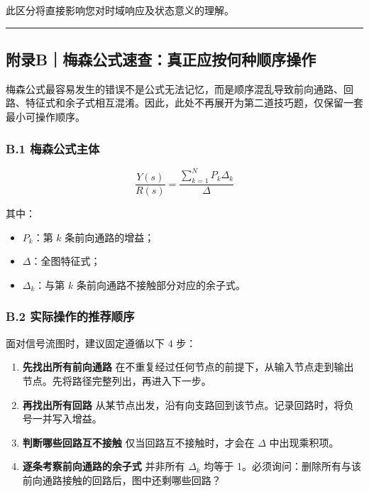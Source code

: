 \documentclass[
  11pt]{article}
\providecommand{\tightlist}{%
  \setlength{\itemsep}{0pt}\setlength{\parskip}{0pt}}
\begin{document}
此区分将直接影响您对时域响应及状态意义的理解。

\begin{center}\rule{0.5\linewidth}{0.5pt}\end{center}

\subsection{附录B｜梅森公式速查：真正应按何种顺序操作}\label{ux9644ux5f55bux6885ux68eeux516cux5f0fux901fux67e5ux771fux6b63ux5e94ux6309ux4f55ux79cdux987aux5e8fux64cdux4f5c}

梅森公式最容易发生的错误不是公式无法记忆，而是顺序混乱导致前向通路、回路、特征式和余子式相互混淆。因此，此处不再展开为第二道技巧题，仅保留一套最小可操作顺序。

\subsubsection{B.1
梅森公式主体}\label{b.1-ux6885ux68eeux516cux5f0fux4e3bux4f53}

\[
\frac{Y(s)}{R(s)}=\frac{\sum_{k=1}^{N}P_k\Delta_k}{\Delta}
\]

其中：

\begin{itemize}
\tightlist
\item
  \(P_k\)：第 \(k\) 条前向通路的增益；
\item
  \(\Delta\)：全图特征式；
\item
  \(\Delta_k\)：与第 \(k\) 条前向通路不接触部分对应的余子式。
\end{itemize}

\subsubsection{B.2
实际操作的推荐顺序}\label{b.2-ux5b9eux9645ux64cdux4f5cux7684ux63a8ux8350ux987aux5e8f}

面对信号流图时，建议固定遵循以下 4 步：

\begin{enumerate}
\def\labelenumi{\arabic{enumi}.}
\item
  \textbf{先找出所有前向通路}
  在不重复经过任何节点的前提下，从输入节点走到输出节点。先将路径完整列出，再进入下一步。
\item
  \textbf{再找出所有回路}
  从某节点出发，沿有向支路回到该节点。记录回路时，将负号一并写入增益。
\item
  \textbf{判断哪些回路互不接触} 仅当回路互不接触时，才会在 \(\Delta\)
  中出现乘积项。
\item
  \textbf{逐条考察前向通路的余子式} 并非所有 \(\Delta_k\) 均等于
  1。必须询问：删除所有与该前向通路接触的回路后，图中还剩哪些回路？
\end{enumerate}
\end{document}
